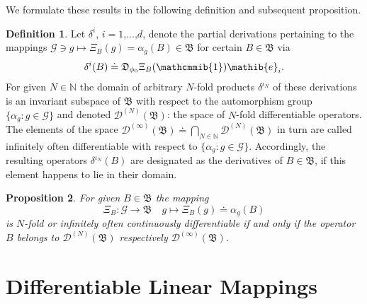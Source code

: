 \documentclass[11pt,twoside,openright]{report}
\theoremstyle{definition}
\newtheorem{Def}{Definition}[chapter]
\theoremstyle{plain}
\newtheorem{Pro}[Def]{Proposition}
\theoremstyle{remark}
\theoremstyle{assumption}
\newcommand{\bset}[1]{\bigl\{ #1 \bigr\}}
\newcommand{\Nbb}{\mathbb{N}}
\newcommand{\Bfrak}{\mathfrak{B}}
\newcommand{\Dfrak}{\mathfrak{D}}
\newcommand{\eib}{\mathib{e}}
\newcommand{\Dscr}{\mathscr{D}}
\newcommand{\Gscr}{\mathscr{G}}
\newcommand{\neutral}{\mathcmmib{1}}
\begin{document}
We formulate these results in the following definition and subsequent
proposition.
\begin{Def}
  \label{Def-partial-derivations}
  Let $\delta^i$, $i = 1 \text{,} \dots \text{,} d$, denote the
  partial derivations pertaining to the mappings $\Gscr \ni g \mapsto
  \Xi_B ( g ) = \alpha_g ( B ) \in \Bfrak$ for certain $B \in \Bfrak$
  via
  \begin{equation}
    \label{eq-def-partial-derivations}
    \delta^i ( B ) \doteq \Dfrak_{\phi_0} \Xi_B ( \neutral ) \eib_i
    \text{.} 
  \end{equation}
  For given $N \in \Nbb$ the domain of arbitrary $N$-fold products
  $\delta^{\iota_N}$ of these derivations is an invariant subspace of
  $\Bfrak$ with respect to the automorphism group $\bset{\alpha_g : g
  \in \Gscr}$ and denoted $\Dscr^{( N )} ( \Bfrak )$: the space of
  $N$-fold differentiable operators. The elements of the space
  $\Dscr^{( \infty )} ( \Bfrak ) \doteq \bigcap_{N \in \Nbb} \Dscr^{(
  N )} ( \Bfrak )$ in turn are called infinitely often differentiable
  with respect to $\bset{\alpha_g : g \in \Gscr}$. Accordingly, the
  resulting operators $\delta^{\iota_N} ( B )$ are designated as the
  derivatives of $B \in \Bfrak$, if this element happens to lie in
  their domain.
\end{Def}
\begin{Pro}
  \label{Pro-partial-derivations}
  For given $B \in \Bfrak$ the mapping
  \begin{equation*}
    \Xi_B : \Gscr \rightarrow \Bfrak \quad g \mapsto \Xi_B ( g )
    \doteq \alpha_g ( B )
  \end{equation*}
  is $N$-fold or infinitely often continuously differentiable if and
  only if the operator $B$ belongs to $\Dscr^{( N )} ( \Bfrak )$
  respectively $\Dscr^{( \infty )} ( \Bfrak )$.
\end{Pro}


\section{Differentiable Linear Mappings}
\end{document}
